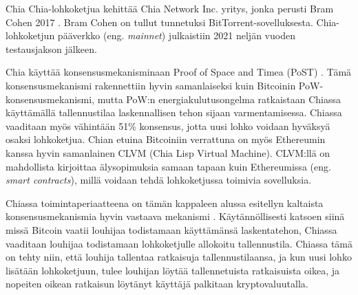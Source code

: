 \begin{subsection}{Chia\label{chia}}
Chia-lohkoketjua kehittää Chia Network Inc. yritys, jonka perusti Bram Cohen 2017 \cite{chia1}. Bram Cohen on tullut tunnetuksi
BitTorrent-sovelluksesta. Chia-lohkoketjun pääverkko (eng. \textit{mainnet}) julkaistiin 2021 neljän vuoden testausjakson jälkeen.

Chia käyttää konsensusmekanisminaan Proof of Space and Timea (PoST) \cite{chia1}. Tämä konsensusmekanismi rakennettiin hyvin samanlaiseksi kuin Bitcoinin PoW-konsensusmekanismi, mutta PoW:n energiakulutusongelma ratkaistaan Chiassa käyttämällä tallennustilaa laskennallisen tehon sijaan varmentamisessa. Chiassa vaaditaan myös vähintään 51\% konsensus, jotta uusi lohko voidaan hyväksyä osaksi lohkoketjua. Chian etuina Bitcoiniin verrattuna on myös Ethereumin kanssa hyvin samanlainen CLVM (Chia Lisp Virtual Machine). CLVM:llä on mahdollista kirjoittaa älysopimuksia samaan tapaan kuin Ethereumissa (eng. \textit{smart contracts}), millä voidaan tehdä lohkoketjussa toimivia sovelluksia.

Chiassa toimintaperiaatteena on tämän kappaleen alussa esitellyn kaltaista konsensusmekanismia hyvin vastaava mekanismi \cite{pospchia1}. Käytännöllisesti katsoen siinä missä Bitcoin vaatii louhijaa todistamaan käyttämänsä laskentatehon, Chiassa vaaditaan louhijaa todistamaan lohkoketjulle allokoitu tallennustila. Chiassa tämä on tehty niin, että louhija tallentaa ratkaisuja tallennustilaansa, ja kun uusi lohko lisätään lohkoketjuun, tulee louhijan löytää tallennetuista ratkaisuista oikea, ja nopeiten oikean ratkaisun löytänyt käyttäjä palkitaan kryptovaluutalla.


\end{subsection}
